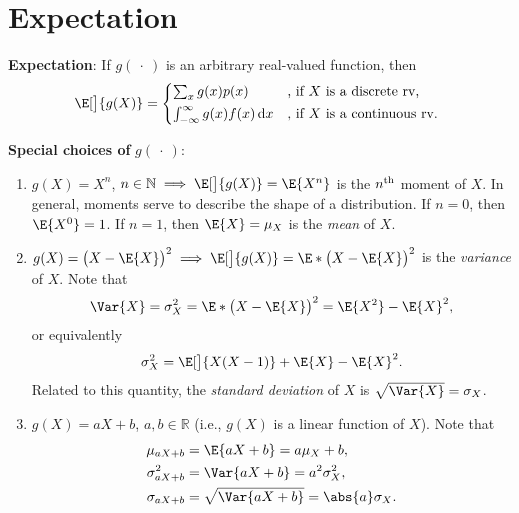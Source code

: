 \section*{Expectation}
\begin{Regular}
    \textbf{Expectation}: If $ g(\:\cdot\:) $ is an arbitrary real-valued function, then
    \[ \E[\big]{g(X)}=\begin{cases*}
            \sum_{x}g(x)p(x)                        & , if $ X $ is a discrete rv,   \\
            \int_{-\infty}^{\infty}g(x)f(x)\odif{x} & , if $ X $ is a continuous rv.
        \end{cases*} \]
\end{Regular}
\begin{Regular}
    \textbf{Special choices of} $ g(\:\cdot\:) $:
    \begin{enumerate}[1.]
        \item $ g(X)=X^n $, $ n\in\mathbb{N}\implies \E[\big]{g(X)}=\E{X^n} $ is the $ n\textsuperscript{th} $ moment of $ X $. In general,
              moments serve to describe the shape of a distribution. If $ n=0 $, then $ \E{X^0}=1 $. If $ n=1 $, then $ \E{X}=\mu_X $ is the \emph{mean} of $ X $.
        \item $ g(X)=\bigl(X-\E{X}\bigr)^2\implies \E[\big]{g(X)}=\E*{\bigl(X-\E{X}\bigr)^2} $ is the \emph{variance} of $ X $. Note that
              \[ \Var{X}=\sigma_X^2=\E*{\bigl(X-\E{X}\bigr)^2}=\E{X^2}-\E{X}^2, \]
              or equivalently
              \[ \sigma_X^2=\E[\big]{X(X-1)}+\E{X}-\E{X}^2. \]
              Related to this quantity, the \emph{standard deviation} of $ X $ is $ \sqrt{\Var{X}}=\sigma_X $.
        \item $ g(X)=aX+b $, $ a,b\in\mathbb{R} $ (i.e., $ g(X) $ is a linear function of $ X $). Note that
              \begin{align*}
                  \mu_{aX+b}      & =\E{aX+b}=a \mu_X+b,                \\
                  \sigma^2_{aX+b} & =\Var{aX+b}=a^2 \sigma_X^2,         \\
                  \sigma_{aX+b}   & =\sqrt{\Var{aX+b}}=\abs{a}\sigma_X.
              \end{align*}
    \end{enumerate}
\end{Regular}
